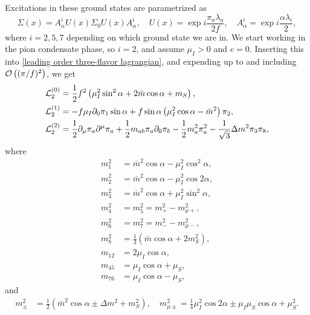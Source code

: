 Excitations in these ground states are parametrized as
%
\begin{equation}
    \Sigma(x) = A^i_\alpha U(x) \Sigma_0 U(x) A^i_\alpha, \quad
    U(x) = \exp{i \frac{\pi_a \lambda_a}{2 f}}, \quad
    A_\alpha^i = \exp{i \frac{\alpha \lambda_i}{2}},
\end{equation}
%
where $i = 2, 5, 7$ depending on which ground state we are in.
We start working in the pion condensate phase, so $i = 2$, and assume $\mu_I > 0$ and $e = 0$.
Inserting this into \autoref{leading order three-flavor lagrangian}, and expending up to and including $\mathcal O\left((\pi/f)^2\right)$, we get
%
\begin{align}
    \label{static three-flavor lagrangian}
    \mathcal{L}_2^{(0)} 
    &=
    \frac{1}{2} f^2
    \left(
        \mu_I^2 \sin^2\alpha
        + 2\bar m \cos\alpha
        + m_S
    \right), \\
    \label{linear three-flavor lagrangian}
    \mathcal{L}_2^{(1)}
    &=
    -f \mu_I \partial_0 \pi_1 \sin\alpha
    + f \sin\alpha
    \left(
        \mu_I^2\cos\alpha - \bar m^2
    \right)\pi_2, \\
    \label{quadratic three-flavor lagrangian}
    \mathcal{L}_2^{(2)} 
    &= 
    \frac{1}{2}\partial_\mu \pi_a \partial^\mu \pi_a
    + \frac{1}{2} m_{ab} \pi_a\partial_0\pi_b
    - \frac{1}{2} m_a^2 \pi_a^2
    - \frac{1}{\sqrt{3}} \Delta m^2 \pi_3 \pi_8,
\end{align}
%
where
%
\begin{align}
    m_1^2 &=  \bar m^2\cos\alpha - \mu_I^2 \cos^2\alpha,\\
    m_2^2 &= \bar m^2\cos\alpha - \mu_I^2 \cos2\alpha, \\
    m_3^2 &= \bar m^2\cos\alpha + \mu_I^2 \sin^2\alpha, \\
    m_4^2 &= m_5^2 = m_+^2 - m_{\mu+}^2, \\
    m_6^2 &= m_7^2 = m_-^2 - m^2_{\mu-}, \\
    m_8^2 &= \frac{1}{3} (\bar m\cos\alpha + 2 m_S^2), \\
    m_{12} & = 2 \mu_I\cos\alpha,\\
    m_{45} & =\mu_I\cos\alpha + \mu_S, \\
    m_{76} & = \mu_I\cos\alpha - \mu_S,
\end{align}
%
and
\begin{align}
    m_\pm^2 &= \frac{1}{2} (\bar m^2 \cos\alpha \pm \Delta m^2 + m_S^2),
    \quad
    m^2_{\mu\pm } = \frac{1}{4}\mu_I^2 \cos2\alpha \pm \mu_I\mu_S \cos\alpha + \mu_S^2.
\end{align}
